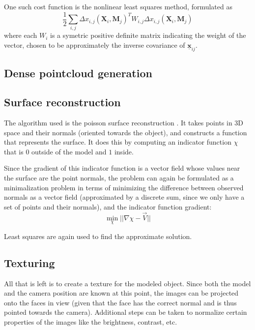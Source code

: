 One such cost function is the nonlinear least squares method, formulated as 
\begin{equation} \frac{1}{2} \sum_{i,j} \Delta x_{i, j} (\mathbf{X}_i, \mathbf{M}_j)^T W_{i,j} \Delta x_{i, j} (\mathbf{X}_i, \mathbf{M}_j) \end{equation}
where each $W_i$ is a symetric positive definite matrix indicating the weight of the vector, chosen to be approximately the inverse covariance of $\underline{\bm{x}}_{ij}$.

\subsection{Dense pointcloud generation}

\subsection{Surface reconstruction}
The algorithm used is the poisson surface reconstruction \cite{kazhdan2006poisson}.
It takes points in 3D space and their normals (oriented towards the object), and constructs a function that represents the surface.
It does this by computing an indicator function $\chi$ that is $0$ outside of the model and $1$ inside.

Since the gradient of this indicator function is a vector field whose values near the surface are the point normals, the problem can again be formulated as a minimalization problem in terms of minimizing the difference between observed normals as a vector field (approximated by a discrete sum, since we only have a set of points and their normals), and the indicator function gradient:
\begin{equation} \min_\chi || \nabla \chi - \vec{V}|| \end{equation}

Least squares are again used to find the approximate solution. 

\subsection{Texturing}
All that is left is to create a texture for the modeled object.
Since both the model and the camera position are known at this point, the images can be projected onto the faces in view (given that the face has the correct normal and is thus pointed towards the camera).
Additional steps can be taken to normalize certain properties of the images like the brightness, contrast, etc.

